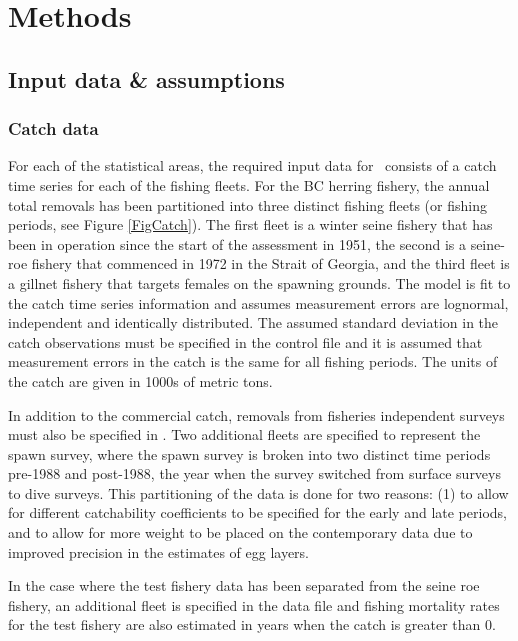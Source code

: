 \section{Methods}
	\subsection{Input data \& assumptions}
	\subsubsection{Catch data}
	For each of the statistical areas, the required input data for \iscam\ consists of a catch time series for each of the fishing fleets.  For the BC herring fishery, the annual total removals has been partitioned into three distinct fishing fleets (or fishing periods, see Figure \ref{FigCatch}).  The first fleet is a winter seine fishery that has been in operation since the start of the assessment in 1951, the second is a seine-roe fishery that commenced in 1972 in the Strait of Georgia, and the third fleet is a gillnet fishery that targets females on the spawning grounds. The model is fit to the catch time series information and assumes measurement errors are lognormal, independent and identically distributed.  The assumed standard deviation in the catch observations must be specified in the control file and it is assumed that measurement errors in the catch is the same for all fishing periods.  The units of the catch are given in 1000s of metric tons.
	
	In addition to the commercial catch, removals from fisheries independent surveys must also be specified in \iscam. Two additional fleets are specified to represent the spawn survey, where the spawn survey is broken into two distinct time periods pre-1988 and post-1988, the year when the survey switched from surface surveys to dive surveys.  This partitioning of the data is done for two reasons: (1) to allow for different catchability coefficients to be specified for the early and late periods, and to allow for more weight to be placed on the contemporary data due to improved precision in the estimates of egg layers. 

	In the case where the test fishery data has been separated from the seine roe fishery, an additional fleet is specified in the data file and fishing mortality rates for the test fishery are also estimated in years when the catch is greater than 0.
	
